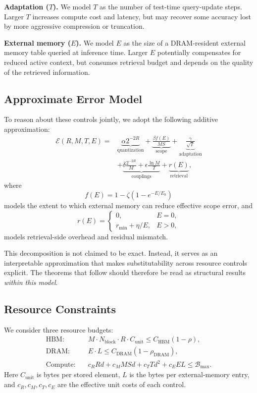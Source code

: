\documentclass[11pt,a4paper]{article}
\theoremstyle{plain}
\theoremstyle{definition}
\begin{document}
\textbf{Adaptation ($T$).} We model $T$ as the number of test-time query-update steps. Larger $T$ increases compute cost and latency, but may recover some accuracy lost by more aggressive compression or truncation.

\textbf{External memory ($E$).} We model $E$ as the size of a DRAM-resident external memory table queried at inference time. Larger $E$ potentially compensates for reduced active context, but consumes retrieval budget and depends on the quality of the retrieved information.

\subsection{Approximate Error Model}
To reason about these controls jointly, we adopt the following additive approximation:
\begin{equation}
\begin{aligned}
\mathcal{E}(R,M,T,E) = &\underbrace{\alpha 2^{-2R}}_{\text{quantization}} + \underbrace{\frac{\beta f(E)}{MS}}_{\text{scope}} + \underbrace{\frac{\gamma}{\sqrt{T}}}_{\text{adaptation}} \\
&+ \underbrace{\delta\frac{2^{-2R}}{M} + \epsilon\frac{\ln M}{T}}_{\text{couplings}} + \underbrace{r(E)}_{\text{retrieval}},
\end{aligned}
\label{eq:error}
\end{equation}
where
\[
f(E) = 1 - \zeta(1 - e^{-E/E_0})
\]
models the extent to which external memory can reduce effective scope error, and
\[
r(E) =
\begin{cases}
0, & E=0,\\
r_{\min} + \eta/E, & E>0,
\end{cases}
\]
models retrieval-side overhead and residual mismatch.

This decomposition is not claimed to be exact. Instead, it serves as an interpretable approximation that makes substitutability across resource controls explicit. The theorems that follow should therefore be read as structural results \emph{within this model}.

\subsection{Resource Constraints}
We consider three resource budgets:
\begin{align}
\text{HBM:}\quad & M \cdot N_{\text{block}} \cdot R \cdot C_{\text{unit}} \leq C_{\text{HBM}}(1-\rho), \label{eq:hbm} \\
\text{DRAM:}\quad & E \cdot L \leq C_{\text{DRAM}}(1-\rho_{\text{DRAM}}), \label{eq:dram} \\
\text{Compute:}\quad & c_R R d + c_M M S d + c_T T d^2 + c_E E L \leq \mathcal{B}_{\max}. \label{eq:compute}
\end{align}
Here $C_{\text{unit}}$ is bytes per stored element, $L$ is the bytes per external-memory entry, and $c_R,c_M,c_T,c_E$ are the effective unit costs of each control.
\end{document}
